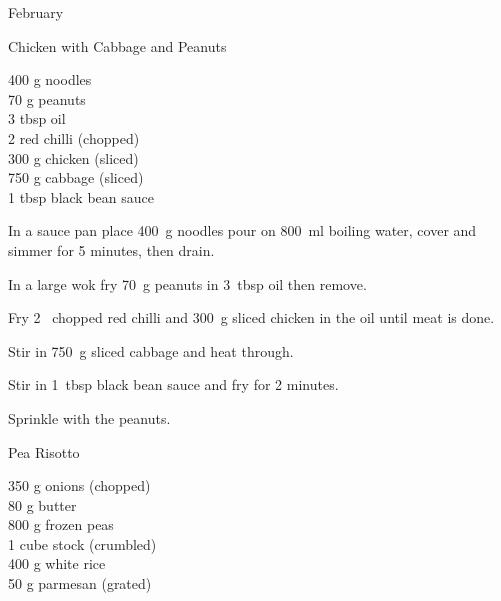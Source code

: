 \begin{menu}{February}
    \begin{recipe}{2}{Chicken with Cabbage and Peanuts}%
		\begin{ingredients}
		400 g noodles  \\
	70 g peanuts  \\
	3 tbsp oil  \\
	2  red chilli (chopped) \\
	300 g chicken (sliced) \\
	750 g cabbage (sliced) \\
	1 tbsp black bean sauce  \\
	
		\end{ingredients}
	
	
    \begin{instructions}
    \item 
    In a
    sauce pan
    place
    400~g  noodles
    pour on
    800~ml  boiling water,
    cover and simmer for 5 minutes, then drain.
  \item 
        In a large wok	fry
        70~g  peanuts
        in
        3~tbsp  oil
        then remove.
      \item 
        Fry 2~ chopped red chilli
        and
        300~g sliced chicken
        in the oil until meat is done.
      \item 
        Stir in
        750~g sliced cabbage
        and heat through.
      \item 
        Stir in
        1~tbsp  black bean sauce
        and fry for 2 minutes.
      \item 
        Sprinkle with the peanuts.
      
    \end{instructions}
    \end{recipe}%
  
    \begin{recipe}{2}{Pea Risotto}%
		\begin{ingredients}
		350 g onions (chopped) \\
	80 g butter  \\
	800 g frozen peas  \\
	1 cube stock (crumbled) \\
	400 g white rice  \\
	50 g parmesan (grated) \\
	
		\end{ingredients}
	

\end{recipe}
\end{menu}
